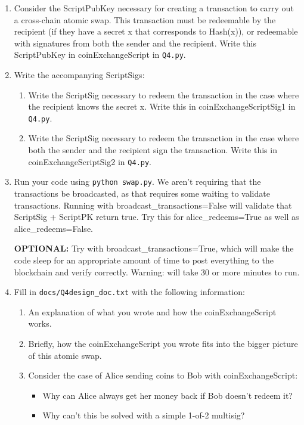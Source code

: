 \documentclass[11pt]{article}
\newenvironment{problems}
{\begin{enumerate}[label=\bfseries Exercise \arabic*.,align=left]}
{\end{enumerate}}
\begin{document}
\begin{problems}
    \begin{enumerate}
    \item
    	Consider the ScriptPubKey necessary for creating a transaction to carry out a cross-chain atomic swap. This transaction must be redeemable by the recipient (if they have a secret x that corresponds to Hash(x)), or redeemable with signatures from both the sender and the recipient. Write this ScriptPubKey in coinExchangeScript in \texttt{Q4.py}.

    \item Write the accompanying ScriptSigs:
    	\begin{enumerate}
    	\item
    		Write the ScriptSig necessary to redeem the transaction in the case where the recipient knows the secret x. Write this in coinExchangeScriptSig1 in \texttt{Q4.py}.
    	\item
    		Write the ScriptSig necessary to redeem the transaction in the case where both the sender and the recipient sign the transaction. Write this in coinExchangeScriptSig2 in \texttt{Q4.py}.
    	\end{enumerate}
    \item
    	Run your code using \texttt{python swap.py}. We aren't requiring that the transactions be broadcasted, as that requires some waiting to validate transactions. Running with broadcast\_transactions=False will validate that ScriptSig + ScriptPK return true. Try this for alice\_redeems=True as well as alice\_redeems=False.

    	\textbf{OPTIONAL:} Try with broadcast\_transactions=True, which will make the code sleep for an appropriate amount of time to post everything to the blockchain and verify correctly. Warning: will take 30 or more minutes to run.
    \item Fill in \texttt{docs/Q4design\_doc.txt} with the following information:
        \begin{enumerate}
            \item An explanation of what you wrote and how the coinExchangeScript works.
            \item Briefly, how the coinExchangeScript you wrote fits into the bigger
            picture of this atomic swap.
            \item Consider the case of Alice sending coins to Bob with coinExchangeScript:
                \begin{itemize}
                    \item Why can Alice always get her money back if Bob doesn't redeem it?
                    \item Why can't this be solved with a simple 1-of-2 multisig?
                \end{itemize}
            
        \end{enumerate}

    \end{enumerate}
\end{problems}
\end{document}

